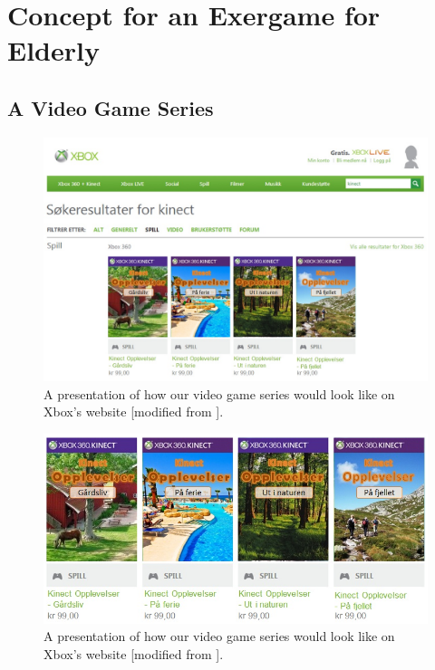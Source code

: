 \chapter{Concept for an Exergame for Elderly}


\section{A Video Game Series}
\begin{figure} [ht!]
\centering
\includegraphics[scale=0.5, angle=90]{SpillXboxNYNY.jpg}
\caption[Presentation of our video game series]{A presentation of how our video game series would look like on Xbox's website [modified from \cite{XboxNettside}].}
\label{fig:videogameseries}
\end{figure}

\begin{figure} [ht!]
\centering
\includegraphics[scale=0.7]{SpillXboxNY.png}
\caption[Presentation of our video game series]{A presentation of how our video game series would look like on Xbox's website [modified from \cite{XboxNettside}].}
\label{fig:videogameseries}
\end{figure}

